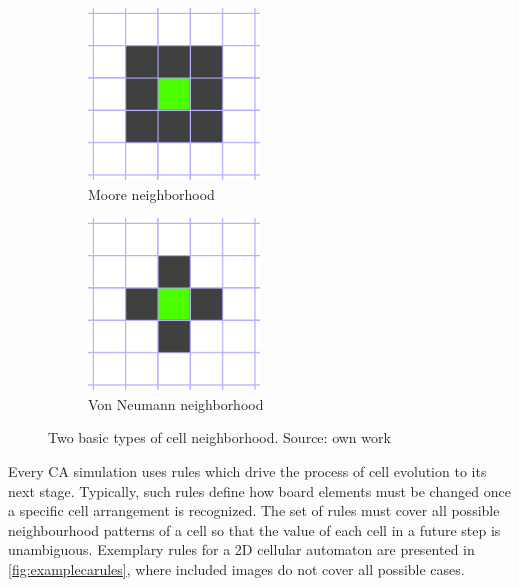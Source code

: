 \documentclass[12pt]{report}
\begin{document}
\begin{figure}[h]
	\centering
	\begin{subfigure}[t]{0.4\textwidth}
		\centering
		\includegraphics[width=0.5\textwidth]{images/neighborsmoore}
		\caption{Moore neighborhood} 
	\end{subfigure} \hspace{1em}
	\hfill
	\begin{subfigure}[t]{0.4\textwidth}
		\centering
		\includegraphics[width=0.5\textwidth]{images/neighborsvonneumann}
		\caption{Von Neumann neighborhood} 
	\end{subfigure} \hspace{1em} 
	\caption{Two basic types of cell neighborhood. Source: own work}
	\label{fig:neighborhood_types}
\end{figure}


Every CA simulation uses rules which drive the process of cell evolution to its next stage. Typically, such rules define how board elements must be changed once a specific cell arrangement is recognized. The set of rules must cover all possible neighbourhood patterns of a cell so that the value of each cell in a future step is unambiguous. Exemplary rules for a 2D cellular automaton are presented in  \cref{fig:examplecarules}, where included images do not cover all possible cases.
\end{document}
